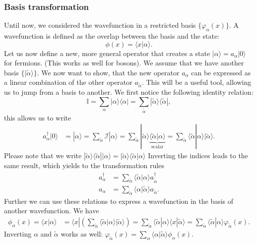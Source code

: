 \documentclass[../main.tex]{subfile}
\begin{document}
\subsubsection{Basis transformation}
Until now, we considered the wavefunction in a restricted basis $\{\varphi_{\alpha}(x)\}$. A wavefunction is defined as the overlap between the basis and the state:
\[
    \phi(x) = \langle x | \alpha \rangle.
\]
Let us now define a new, more general operator that creates a state $|\alpha\rangle = a_{\alpha}|0\rangle$ for fermions. (This works as well for bosons).
We assume that we have another basis $\{|\tilde{\alpha}\rangle\}$.
We now want to show, that the new operator $a_{\alpha}$ can be expressed as a linear combination of the other operator  $a_{\tilde{\alpha}}$. This will be a
useful tool, allowing us to jump from a basis to another. We first notice the following identity relation:
\[
    \mathbb{I} = \sum_{\alpha} | \alpha \rangle \langle \alpha| = \sum_{\tilde{\alpha}} | \tilde{\alpha} \rangle \langle \tilde{\alpha}|,
\]
this allows us to write 
\begin{align*}  
    a_{\alpha}^{\dagger}|0\rangle &= | \alpha \rangle =  \sum_{\tilde{\alpha}}\mathcal{I}|\alpha\rangle 
    =\sum_{\tilde{\alpha}}|\tilde{\alpha}\rangle\underbrace{\langle\tilde{\alpha}|\alpha\rangle}_{\text{scalar}} 
    = \sum_{\tilde{\alpha}}\langle\tilde{\alpha}|\alpha\rangle |\tilde{\alpha}\rangle.
\end{align*}
Please note that we write $|\tilde{\alpha}\rangle\langle\tilde{\alpha}||\alpha\rangle = |\tilde{\alpha}\rangle\langle\tilde{\alpha}|\alpha\rangle$
Inverting the indices leads to the same result, which yields to the transformation rules
\begin{align*}
    a_{\alpha}^{\dagger} &= \sum_{\tilde{\alpha}}\langle\tilde{\alpha}|\alpha\rangle a_{\tilde{\alpha}}^{\dagger}\\
    a_{\alpha} &= \sum_{\tilde{\alpha}}\langle\alpha|\tilde{\alpha}\rangle a_{\tilde{\alpha}}.
\end{align*}
Further we can use these relations to express a wavefunction in the basis of another wavefunction. We have
\begin{align*}
    \phi_{\alpha}(x) = \langle x|\alpha\rangle &= \langle x|\left(\sum_{\tilde{\alpha}} \langle \tilde{\alpha}|\alpha\rangle |\tilde{\alpha}\rangle\right) = \sum_{\tilde{\alpha}}  \langle \tilde{\alpha}|\alpha\rangle\langle x|\tilde{\alpha}\rangle
    = \sum_{\tilde{\alpha}} \langle \tilde{\alpha}|\alpha\rangle \varphi_{\tilde{\alpha}}(x).
\end{align*}
Inverting $\alpha$ and $\tilde{\alpha}$ works as well: $\varphi_{\tilde{\alpha}}(x) = \sum_{\alpha} \langle \alpha|\tilde{\alpha}\rangle \phi_{\alpha}(x)$.\\
\end{document}
